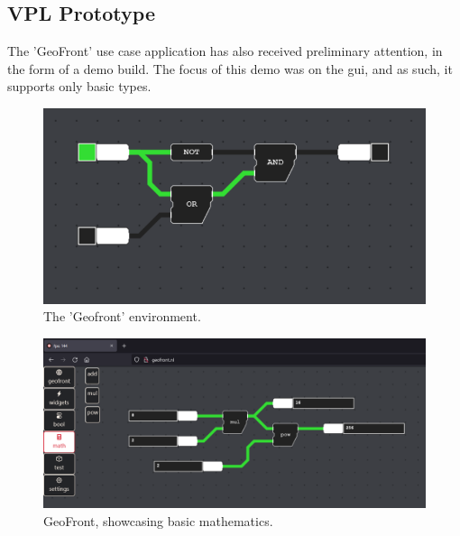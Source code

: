 \subsection{VPL Prototype}
\label{sec:preliminary-vpl}

The 'GeoFront' use case application has also received preliminary attention, in the form of a demo build. The focus of this demo was on the \ac{gui}, and as such, it supports only basic types. 

\begin{figure}[!tbp]
  \centering
  \begin{minipage}[b]{1.0\textwidth}
    \includegraphics[width=\textwidth]{../images/geofront-1.PNG}
    \caption{The 'Geofront' environment.}
    \label{fig:geofront-1}
  \end{minipage}
\end{figure}


\begin{figure}[!tbp]
  \centering
  \begin{minipage}[b]{1.0\textwidth}
    \includegraphics[width=\textwidth]{../images/geofront-2.PNG}
    \caption{GeoFront, showcasing basic mathematics.}
    \label{fig:geofront-2}
  \end{minipage}
\end{figure}


